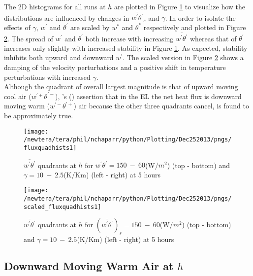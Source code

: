\clearpage

The 2D histograms for all runs at $h$ are plotted in Figure \ref{fig:fluxquadsh1} to visualize how the distributions are influenced by changes in $\overline{w^{'} \theta^{'}}_{s}$ and $\gamma$.  In order to isolate the effects of $\gamma$,  $w^{'}$ and $\theta^{'}$ are scaled by $w^{*}$ and $\theta^{*}$ respectively and plotted in Figure \ref{fig:scaled_fluxquadsh1}.  The spread of $w^{'}$ and $\theta^{'}$ both increase with increasing $\overline{w^{'}\theta^{'}}$ whereas that of $\theta^{'}$ increases only slightly with increased stability in Figure \ref{fig:fluxquadsh1}.  As expected, stability inhibits both upward and downward $w^{'}$. The scaled version in Figure \ref{fig:scaled_fluxquadsh1} shows a damping of the velocity perturbations and a positive shift in temperature perturbations with increased $\gamma$.\\ 

Although the quadrant of overall largest magnitude is that of upward moving cool air ($w^{'+}\theta^{'-}$), \citeauthor{SullMoengStev}'s (\citeyear{SullMoengStev}) assertion that in the \acs{EL} the net heat flux is downward moving warm ($w^{'-}\theta^{'+}$) air because the other three quadrants cancel, is found to be approximately true.\\


\begin{figure}[htbp]
\centering
 \texttt{[image: /newtera/tera/phil/nchaparr/python/Plotting/Dec252013/pngs/fluxquadhists1]}                 
\caption[2D distributions of $w^{'}$ and $\theta^{'}$ for all runs]{$\overline{w^{'}\theta^{'}}$ quadrants at $h$ for $w^{'}\theta^{'} = 150 \ - \ 60$(W/$m^{2}$) (top - bottom) and $\gamma = 10 \ - \  2.5$(K/Km) (left - right) at 5 hours}
\label{fig:fluxquadsh1}
\end{figure}

\begin{figure}[htbp]
\centering
 \texttt{[image: /newtera/tera/phil/nchaparr/python/Plotting/Dec252013/pngs/scaled\_fluxquadhists1]}                 
\caption[Scaled 2D distributions of $w^{'}$ and $\theta^{'}$ for all runs]{$\overline{w^{'}\theta^{'}}$ quadrants at $h$ for $(\overline{w^{'}\theta^{'}})_{s} = 150 \ - \ 60$(W/$m^{2}$) (top - bottom) and $\gamma = 10 \ - \  2.5$(K/Km) (left - right) at 5 hours}
\label{fig:scaled_fluxquadsh1}
\end{figure}


\clearpage

\subsection{Downward Moving Warm Air at $h$}
\label{subsec:downwarm}

